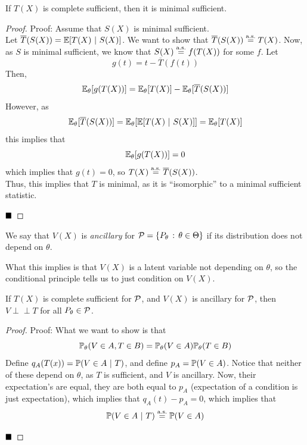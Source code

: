 \begin{theorem}
    If $T(X)$ is complete sufficient, then it is minimal sufficient. 
\end{theorem}
\begin{proof}{Proof:}
    Assume that $S(X)$ is minimal sufficient.\\

    Let $\overline{T}(S(X)) = \bb{E}[T(X) \given S(X)]$. We want to show that $\overline{T}(S(X)) \overset{\tt{a.s.}}{=} T(X)$. Now, as $S$ is minimal sufficient, we know that $S(X) \overset{\tt{a.s.}}{=} f(T(X))$ for some $f$. Let
    \[ g(t) = t - \overline{T}(f(t)) \]
    Then, 
    \begin{align*}
        \bb{E}_{\theta}[g(T(X))] = \bb{E}_{\theta}[T(X)] - \bb{E}_{\theta}[\overline{T}(S(X))]
    \end{align*}
    However, as 
    \[ \bb{E}_{\theta}[\overline{T}(S(X))] = \bb{E}_{\theta}[\bb{E}[T(X) \given S(X)]] = \bb{E}_{\theta}[T(X)] \]
    this implies that
    \[ \bb{E}_{\theta}[g(T(X))] = 0 \]
    which implies that $g(t) = 0$, so $T(X) \overset{\tt{a.s.}}{=} \overline{T}(S(X))$.\\

    Thus, this implies that $T$ is minimal, as it is ``isomorphic'' to a minimal sufficient statistic. 

    $\qed$
\end{proof}

\begin{definition}
    We say that $V(X)$ is \emph{ancillary} for $\cal{P} = \{P_{\theta} \col \theta \in \Theta\}$ if its distribution does not depend on $\theta$. 
\end{definition}

What this implies is that $V(X)$ is a latent variable not depending on $\theta$, so the conditional principle tells us to just condition on $V(X)$. 

\newcommand{\indep}{\perp \!\!\! \perp}
\begin{theorem}
    If $T(X)$ is complete sufficient for $\cal{P}$, and $V(X)$ is ancillary for $\cal{P}$, then $V \indep T$ for all $P_{\theta} \in \cal{P}$. 
\end{theorem}
\begin{proof}{Proof:}
    What we want to show is that
    \[ \bb{P}_{\theta}(V \in A, T \in B) = \bb{P}_{\theta}(V \in A) \bb{P}_{\theta}(T \in B) \]
    Define $q_{A}(T(x)) = \bb{P}(V \in A \given T)$, and define $p_{A} = \bb{P}(V \in A)$. Notice that neither of these depend on $\theta$, as $T$ is sufficient, and $V$ is ancillary. Now, their expectation's are equal, they are both equal to $p_{A}$ (expectation of a condition is just expectation), which implies that $q_{A}(t) - p_{A} = 0$, which implies that
    \[ \bb{P}(V \in A \given T) \overset{\tt{a.s.}}{=} \bb{P}(V \in A) \]

    $\qed$
\end{proof}


